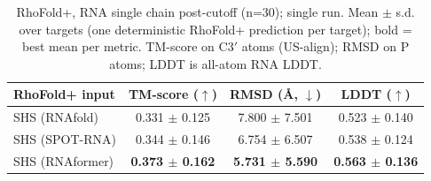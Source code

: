 \begin{table}[htbp]
\centering
\caption{RhoFold+, RNA single chain post-cutoff (n=30); single run. Mean $\pm$ s.d. over targets (one deterministic RhoFold+ prediction per target); bold = best mean per metric. TM-score on C3$'$ atoms (US-align); RMSD on P atoms; LDDT is all-atom RNA LDDT.}
\label{tab:rf_rna_single_chain_post_cutoff}
\begin{tabular}{lccc}
\toprule
RhoFold+ input & TM-score ($\uparrow$) & RMSD (\AA, $\downarrow$) & LDDT ($\uparrow$) \\
\midrule
SHS (RNAfold) & 0.331 $\pm$ 0.125 & 7.800 $\pm$ 7.501 & 0.523 $\pm$ 0.140 \\
SHS (SPOT-RNA) & 0.344 $\pm$ 0.146 & 6.754 $\pm$ 6.507 & 0.538 $\pm$ 0.124 \\
SHS (RNAformer) & \textbf{0.373 $\pm$ 0.162} & \textbf{5.731 $\pm$ 5.590} & \textbf{0.563 $\pm$ 0.136} \\
\bottomrule
\end{tabular}
\end{table}
